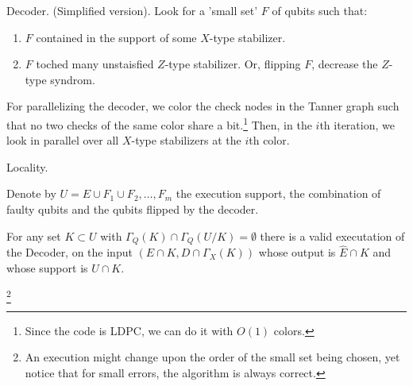 \documentclass{beamer}
\begin{document}
\begin{frame}
  \begin{block}{Decoder. (Simplified version).}
    Look for a 'small set' $F$ of qubits such that:
    \begin{enumerate}
      \item $F$ contained in the support of some $X$-type stabilizer. 
      \item $F$ toched many unstaisfied $Z$-type stabilizer. Or, flipping $F$, decrease the $Z$-type syndrom.    
    \end{enumerate}
  \end{block}
For parallelizing the decoder, we color the check nodes in the Tanner graph such that no two checks of the same color share a bit.\footnote{Since the code is LDPC, we can do it with $O(1)$ colors.} Then, in the $i$th iteration, we look in parallel over all $X$-type stabilizers at the $i$th color.
\end{frame}


\begin{frame}{Locality.}

  \begin{block}
Denote by $U = E \cup F_1 \cup F_2, \ldots, F_m$ the execution support, the combination of faulty qubits and the qubits flipped by the decoder.
  \end{block}

  \begin{block}
  For any set $K\subset U$ with $\Gamma_{Q}(K)\cap \Gamma_{Q}(U / K) = \emptyset$ there is a valid executation of the Decoder, on the input $(E \cap K, D\cap \Gamma_{X}(K))$ whose output is $\hat{E}\cap K$ and whose support is $U \cap K$.
\end{block} \footnote{
An execution might change upon the order of the small set being chosen, yet notice that for small errors, the algorithm is always correct.
}
\end{frame}
\end{document}
